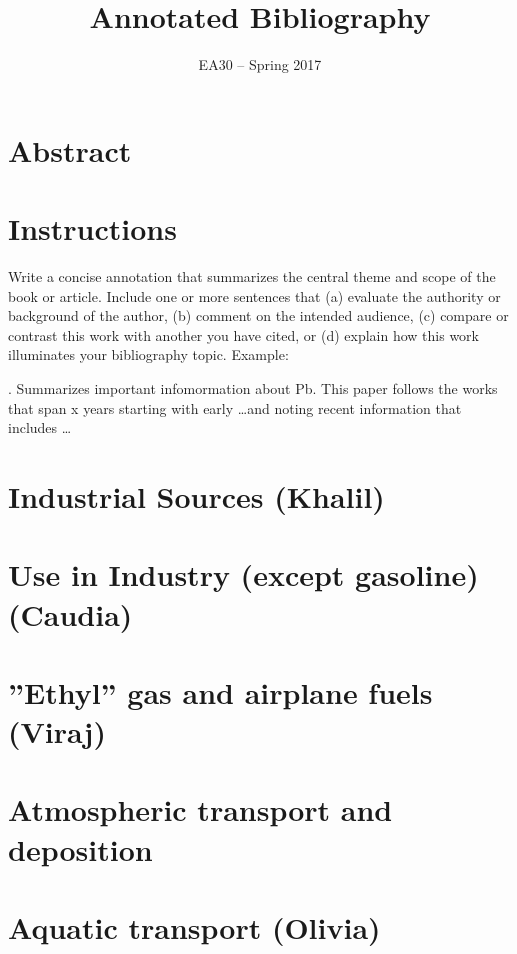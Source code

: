 \documentclass{article}\usepackage[]{graphicx}\usepackage[]{color}
\author{EA30 -- Spring 2017}
\title{Annotated Bibliography}
\begin{document}
\maketitle
{}

\section{Abstract}



\section{Instructions}

Write a concise annotation that summarizes the central theme and scope of the book or article. Include one or more sentences that (a) evaluate the authority or background of the author, (b) comment on the intended audience, (c) compare or contrast this work with another you have cited, or (d) explain how this work illuminates your bibliography topic.
\bigskip
Example: 

 . Summarizes important infomormation about Pb. This paper follows the works that span x years starting with early \ldots and noting recent information that includes \ldots

\section{Industrial Sources (Khalil)}

\section{Use in Industry (except gasoline) (Caudia)}

\section{''Ethyl'' gas and airplane fuels (Viraj)}

\section{Atmospheric transport and deposition}

\section{Aquatic transport (Olivia)}
\end{document}
